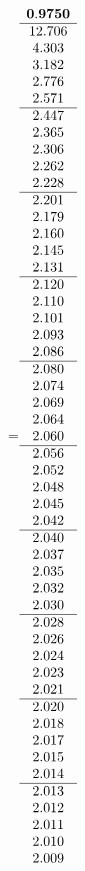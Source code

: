 =\hbox{$\begin{array}{c}
\bf 0.9750 
 \\ \hline 
  12.706 \\ 
   4.303 \\ 
   3.182 \\ 
   2.776 \\ 
   2.571
 \\ \hline 
   2.447 \\ 
   2.365 \\ 
   2.306 \\ 
   2.262 \\ 
   2.228
 \\ \hline 
   2.201 \\ 
   2.179 \\ 
   2.160 \\ 
   2.145 \\ 
   2.131
 \\ \hline 
   2.120 \\ 
   2.110 \\ 
   2.101 \\ 
   2.093 \\ 
   2.086
 \\ \hline 
   2.080 \\ 
   2.074 \\ 
   2.069 \\ 
   2.064 \\ 
   2.060
 \\ \hline 
   2.056 \\ 
   2.052 \\ 
   2.048 \\ 
   2.045 \\ 
   2.042
 \\ \hline 
   2.040 \\ 
   2.037 \\ 
   2.035 \\ 
   2.032 \\ 
   2.030
 \\ \hline 
   2.028 \\ 
   2.026 \\ 
   2.024 \\ 
   2.023 \\ 
   2.021
 \\ \hline 
   2.020 \\ 
   2.018 \\ 
   2.017 \\ 
   2.015 \\ 
   2.014
 \\ \hline 
   2.013 \\ 
   2.012 \\ 
   2.011 \\ 
   2.010 \\ 
   2.009
 \end{array}$}
